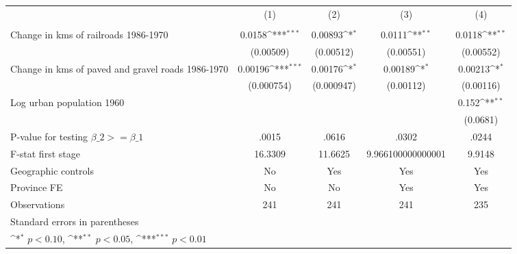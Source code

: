 {
\def\sym#1{\ifmmode^{#1}\else\(^{#1}\)\fi}
\begin{tabular}{l*{4}{c}}
\hline\hline
                &\multicolumn{1}{c}{(1)}&\multicolumn{1}{c}{(2)}&\multicolumn{1}{c}{(3)}&\multicolumn{1}{c}{(4)}\\
                &\multicolumn{1}{c}{}&\multicolumn{1}{c}{}&\multicolumn{1}{c}{}&\multicolumn{1}{c}{}\\
\hline
Change in kms of railroads 1986-1970&   0.0158\sym{***}&  0.00893\sym{*}  &   0.0111\sym{**} &   0.0118\sym{**} \\
                &(0.00509)         &(0.00512)         &(0.00551)         &(0.00552)         \\
[1em]
Change in kms of paved and gravel roads 1986-1970&  0.00196\sym{***}&  0.00176\sym{*}  &  0.00189\sym{*}  &  0.00213\sym{*}  \\
                &(0.000754)         &(0.000947)         &(0.00112)         &(0.00116)         \\
[1em]
Log urban population 1960&                  &                  &                  &    0.152\sym{**} \\
                &                  &                  &                  & (0.0681)         \\
\hline
P-value for testing $\beta\_{2} >= \beta\_{1}$&    .0015         &    .0616         &    .0302         &    .0244         \\
F-stat first stage&  16.3309         &  11.6625         &9.966100000000001         &   9.9148         \\
Geographic controls&       No         &      Yes         &      Yes         &      Yes         \\
Province FE     &       No         &       No         &      Yes         &      Yes         \\
Observations    &      241         &      241         &      241         &      235         \\
\hline\hline
\multicolumn{5}{l}{\footnotesize Standard errors in parentheses}\\
\multicolumn{5}{l}{\footnotesize \sym{*} \(p<0.10\), \sym{**} \(p<0.05\), \sym{***} \(p<0.01\)}\\
\end{tabular}
}
